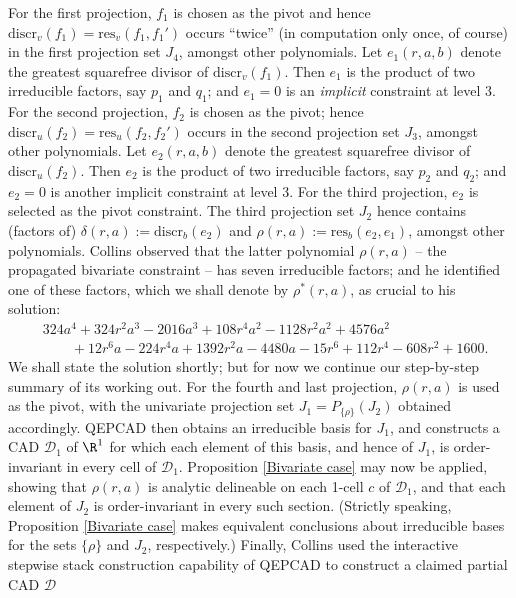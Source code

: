 \documentclass{article}
\begin{document}
For the first projection, $f_1$ is chosen as the pivot and 
hence $\mathrm{discr}_v(f_1) = \mathrm{res}_v(f_1, f_1')$
occurs ``twice'' (in computation only once, of course)
in the first projection set $J_4$, amongst other polynomials.
Let $e_1(r,a,b)$ denote the greatest squarefree divisor of
$\mathrm{discr}_v(f_1)$. Then $e_1$ is the product of two 
irreducible factors, say $p_1$ and $q_1$;
and $e_1 = 0$ is an {\em implicit} constraint at level 3.
For the second projection, $f_2$ is chosen as the pivot;
hence $\mathrm{discr}_u(f_2) = \mathrm{res}_u(f_2, f_2')$
occurs in the second projection set $J_3$, amongst other polynomials.
Let $e_2(r,a,b)$ denote the greatest squarefree divisor of
$\mathrm{discr}_u(f_2)$. Then $e_2$ is the product of two
irreducible factors, say $p_2$ and $q_2$;
and $e_2 = 0$ is another implicit constraint at level 3.
For the third projection, $e_2$ is selected as the pivot constraint.
The third projection set $J_2$ hence contains (factors of)
$\delta(r,a) := \mathrm{discr}_b(e_2)$ and 
$\rho(r,a) := \mathrm{res}_b(e_2, e_1)$, amongst other polynomials.
Collins observed that the latter polynomial $\rho(r,a)$ -- the propagated
bivariate constraint -- has seven irreducible factors;
and he identified one of these factors,
which we shall denote by $\rho^*(r,a)$, as crucial to his solution:
\begin{align*}
&324a^4 + 324r^2 a^3 - 2016a^3 + 108r^4 a^2 - 1128r^2 a^2 + 4576a^2
\\
&\qquad +12r^6 a - 224r^4 a + 1392r^2 a - 4480a - 15r^6 + 112r^4 - 608r^2
                                                           + 1600.
\end{align*}
We shall state the solution shortly; but for now we continue
our step-by-step summary of its working out.
For the fourth and last projection, $\rho(r,a)$ is used as the pivot,
with the univariate projection set 
$J_1 = P_{\{\rho\}}(J_2)$ obtained accordingly.
QEPCAD then obtains an irreducible basis for $J_1$,
and constructs a CAD $\mathcal{D}_1$ of $\R^1$ 
for which each element of this basis,
and hence of $J_1$, is order-invariant in every cell of $\mathcal{D}_1$.
Proposition \ref{Bivariate case} may now be applied,
showing that $\rho(r,a)$ is analytic delineable on each 1-cell $c$
of $\mathcal{D}_1$, and that each element of $J_2$ is order-invariant
in every such section. 
(Strictly speaking, Proposition \ref{Bivariate case} makes equivalent conclusions about irreducible bases for the sets $\{\rho\}$
and $J_2$, respectively.)
Finally, Collins used the interactive stepwise stack construction
capability of QEPCAD to construct a claimed partial CAD $\mathcal{D}$
\end{document}
